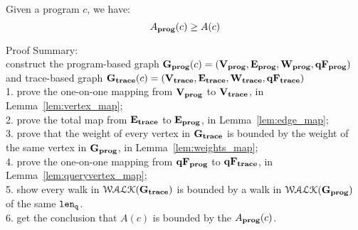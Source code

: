   \begin{thm}
    \label{thm:adaptfun_soundness}
  Given a program ${c}$, we have:
  \[
  A_{\bf{prog}}({c}) \geq A({c})
  \]
  \end{thm}
Proof Summary:
\\
construct the
program-based graph $\mathtt{\bf{G_{prog}}}({c}) = (\mathtt{\bf{V_{prog}}}, \mathtt{\bf{E_{prog}}}, \mathtt{\bf{W_{prog}}}, \mathtt{\bf{qF_{prog}}})$
\\
and trace-based graph $\mathtt{\bf{G_{trace}}}({c}) = (\mathtt{\bf{V_{trace}}}, \mathtt{\bf{E_{trace}}}, \mathtt{\bf{W_{trace}}}, \mathtt{\bf{qF_{trace}}})$ 
\\
1. prove the one-on-one mapping from $\mathtt{\bf{V_{prog}}}$ to $\mathtt{\bf{V_{trace}}}$, in Lemma~\ref{lem:vertex_map};
\\
2. prove the total map from $\mathtt{\bf{E_{trace}}}$ to $\mathtt{\bf{E_{prog}}}$, in Lemma~\ref{lem:edge_map};
\\
3. prove that the weight of every vertex in $\mathtt{\bf{G_{trace}}}$ is bounded by the weight of the same vertex in $\mathtt{\bf{G_{prog}}}$, in 
Lemma~\ref{lem:weights_map};
\\
4. prove the one-on-one mapping from $\mathtt{\bf{qF_{prog}}}$ to $\mathtt{\bf{qF_{trace}}}$, in Lemma~\ref{lem:queryvertex_map};
\\
5. show every walk in $\mathcal{WALK}(\mathtt{\bf{G_{trace}}})$ is bounded by a walk in $\mathcal{WALK}(\mathtt{\bf{G_{prog}}})$ of the same $\mathtt{len}_{\tt q}$.
\\
6. get the conclusion that $A(c)$ is bounded by 
the $A_{\bf{prog}}(c)$.
%
